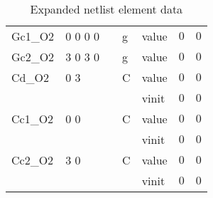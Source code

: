 \begin{table}[H]
\begin{tabular}[c]{lllllll}
\rowcolor{myyellow}
\small{Gc1\_O2} &\small{0 0 0 0 } & &\small{g} &\small{value} &$0$ &$0$ \\ 
\small{Gc2\_O2} &\small{3 0 3 0 } & &\small{g} &\small{value} &$0$ &$0$ \\ 
\rowcolor{myyellow}
\small{Cd\_O2} &\small{0 3 } & &\small{C} &\small{value} &$0$ &$0$ \\ 
 & & & &\small{vinit} &$0$ &$0$ \\ 
\rowcolor{myyellow}
\small{Cc1\_O2} &\small{0 0 } & &\small{C} &\small{value} &$0$ &$0$ \\ 
 & & & &\small{vinit} &$0$ &$0$ \\ 
\rowcolor{myyellow}
\small{Cc2\_O2} &\small{3 0 } & &\small{C} &\small{value} &$0$ &$0$ \\ 
 & & & &\small{vinit} &$0$ &$0$ \\ 
\end{tabular}
\caption{Expanded netlist element data}
\end{table}

